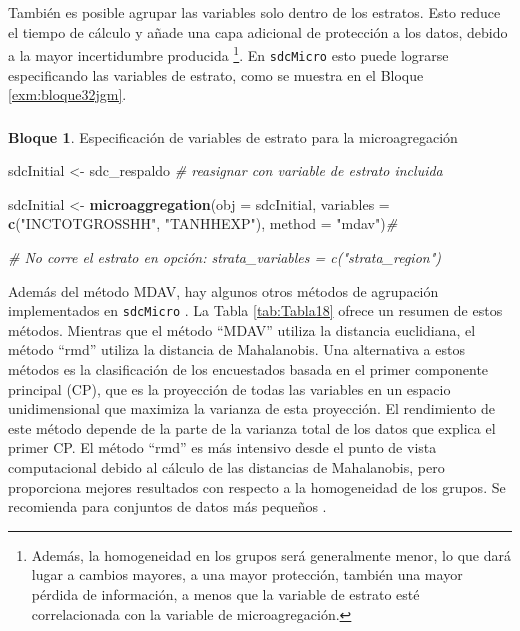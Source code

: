 \documentclass[]{book}
\newenvironment{Shaded}{\begin{snugshade}}{\end{snugshade}}
\newcommand{\CommentTok}[1]{\textcolor[rgb]{0.56,0.35,0.01}{\textit{#1}}}
\newcommand{\DataTypeTok}[1]{\textcolor[rgb]{0.13,0.29,0.53}{#1}}
\newcommand{\KeywordTok}[1]{\textcolor[rgb]{0.13,0.29,0.53}{\textbf{#1}}}
\newcommand{\NormalTok}[1]{#1}
\newcommand{\StringTok}[1]{\textcolor[rgb]{0.31,0.60,0.02}{#1}}
\theoremstyle{definition}
\theoremstyle{definition}
\newtheorem{example}{Bloque}[chapter]
\theoremstyle{definition}
\theoremstyle{definition}
\theoremstyle{remark}
\begin{document}
También es posible agrupar las variables solo dentro de los estratos. Esto reduce el tiempo de cálculo y añade una capa adicional de protección a los datos, debido a la mayor incertidumbre producida \footnote{Además, la homogeneidad en los grupos será generalmente menor, lo que dará lugar a cambios mayores, a una mayor protección, también una mayor pérdida de información, a menos que la variable de estrato esté correlacionada con la variable de microagregación.}. En \texttt{sdcMicro} esto puede lograrse especificando las variables de estrato, como se muestra en el Bloque \ref{exm:bloque32jgm}.

\hypertarget{section-6}{%
\subsubsection{}\label{section-6}}

\begin{example}
\protect\hypertarget{exm:bloque32jgm}{}{\label{exm:bloque32jgm} }Especificación de variables de estrato para la microagregación
\end{example}

\begin{Shaded}
\begin{Highlighting}[]
\NormalTok{sdcInitial <-}\StringTok{ }\NormalTok{sdc_respaldo }\CommentTok{# reasignar con variable de estrato incluida}

\NormalTok{sdcInitial <-}\StringTok{ }\KeywordTok{microaggregation}\NormalTok{(}\DataTypeTok{obj =}\NormalTok{ sdcInitial, }\DataTypeTok{variables =} \KeywordTok{c}\NormalTok{(}\StringTok{"INCTOTGROSSHH"}\NormalTok{, }\StringTok{"TANHHEXP"}\NormalTok{), }\DataTypeTok{method =} \StringTok{"mdav"}\NormalTok{)}\CommentTok{#}

\CommentTok{# No corre el estrato en opción: strata_variables = c("strata_region")}
\end{Highlighting}
\end{Shaded}

Además del método MDAV, hay algunos otros métodos de agrupación implementados en \texttt{sdcMicro} \citep{TeMK14}. La Tabla \ref{tab:Tabla18} ofrece un resumen de estos métodos. Mientras que el método ``MDAV'' utiliza la distancia euclidiana, el método ``rmd'' utiliza la distancia de Mahalanobis. Una alternativa a estos métodos es la clasificación de los encuestados basada en el primer componente principal (CP), que es la proyección de todas las variables en un espacio unidimensional que maximiza la varianza de esta proyección. El rendimiento de este método depende de la parte de la varianza total de los datos que explica el primer CP. El método ``rmd'' es más intensivo desde el punto de vista computacional debido al cálculo de las distancias de Mahalanobis, pero proporciona mejores resultados con respecto a la homogeneidad de los grupos. Se recomienda para conjuntos de datos más pequeños \citep{TeMK14}.
\end{document}
